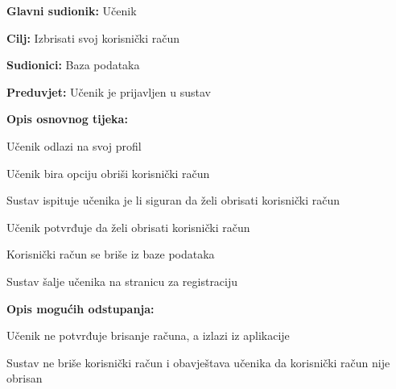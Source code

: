 					\noindent {}
					\begin{packed_item}
	
						\item \textbf{Glavni sudionik: }Učenik
						\item  \textbf{Cilj:} Izbrisati svoj korisnički račun
						\item  \textbf{Sudionici:} Baza podataka
						\item  \textbf{Preduvjet:} Učenik je prijavljen u sustav
						\item  \textbf{Opis osnovnog tijeka:}
						
						\item[] \begin{packed_enum}
	
							\item Učenik odlazi na svoj profil
							\item Učenik bira opciju obriši korisnički račun
							\item Sustav ispituje učenika je li siguran da želi obrisati korisnički račun
							\item Učenik potvrđuje da želi obrisati korisnički račun
							\item Korisnički račun se briše iz baze podataka
							\item Sustav šalje učenika na stranicu za registraciju
						\end{packed_enum}
						
						\item  \textbf{Opis mogućih odstupanja:}
						
						\item[] \begin{packed_item}
	
							\item[4.a] Učenik ne potvrđuje brisanje računa, a izlazi iz aplikacije
							\item[] \begin{packed_enum}
								
								\item Sustav ne briše korisnički račun i obavještava učenika da korisnički račun nije obrisan
								
							\end{packed_enum}
							
						\end{packed_item}
					\end{packed_item}

